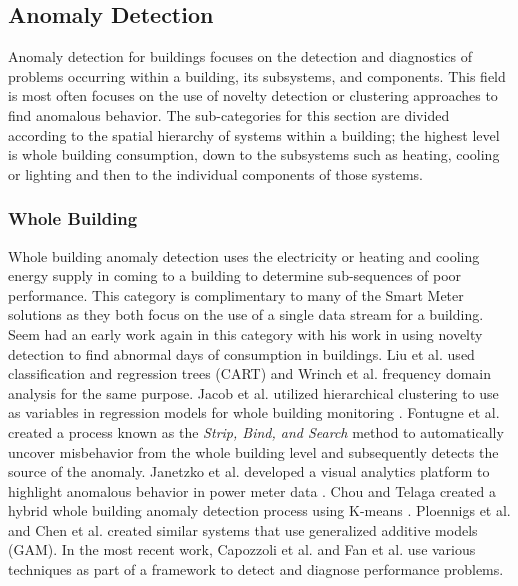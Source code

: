 \subsection{Anomaly Detection}
\label{AnomalyDetection}
Anomaly detection for buildings focuses on the detection and diagnostics of problems occurring within a building, its subsystems, and components. This field is most often focuses on the use of novelty detection or clustering approaches to find anomalous behavior. The sub-categories for this section are divided according to the spatial hierarchy of systems within a building; the highest level is whole building consumption, down to the subsystems such as heating, cooling or lighting and then to the individual components of those systems. 

\subsubsection{Whole Building}
Whole building anomaly detection uses the electricity or heating and cooling energy supply in coming to a building to determine sub-sequences of poor performance. This category is complimentary to many of the Smart Meter solutions as they both focus on the use of a single data stream for a building. Seem \cite{seem_using_2006} had an early work again in this category with his work in using novelty detection to find abnormal days of consumption in buildings. Liu et al. \cite{liu_method_2010} used classification and regression trees (CART) and Wrinch et al. \cite{wrinch_anomaly_2012} frequency domain analysis for the same purpose. Jacob et al. utilized hierarchical clustering to use as variables in regression models for whole building monitoring \cite{jacob_black-box_2010}. Fontugne et al. \cite{fontugne_strip_2013} created a process known as the \emph{Strip, Bind, and Search} method to automatically uncover misbehavior from the whole building level and subsequently detects the source of the anomaly. Janetzko et al. developed a visual analytics platform to highlight anomalous behavior in power meter data \cite{janetzko_anomaly_2013}. Chou and Telaga created a hybrid whole building anomaly detection process using K-means \cite{chou_real-time_2014}. Ploennigs et al. \cite{ploennigs_exploiting_2013} and Chen et al. \cite{chen_statistical_2014} created similar systems that use generalized additive models (GAM). In the most recent work, Capozzoli et al. \cite{capozzoli_fault_2015} and Fan et al. \cite{fan_framework_2015} use various techniques as part of a framework to detect and diagnose performance problems. 

